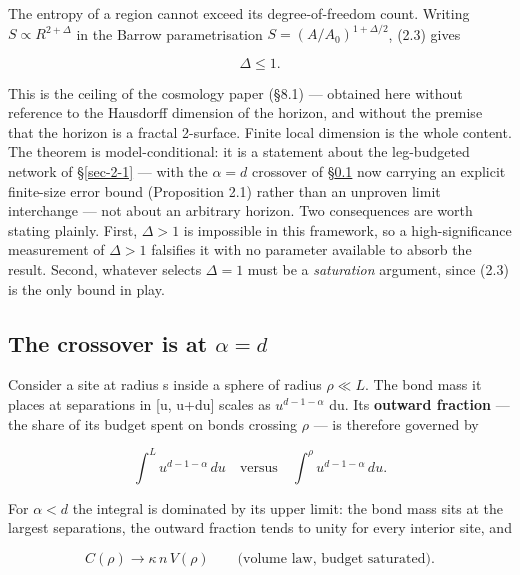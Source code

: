 \documentclass[aps,prd,preprint,nofootinbib,superscriptaddress]{revtex4-2}
\begin{document}
The entropy of a region cannot exceed its degree-of-freedom count.
Writing \(S \propto  R^{2+\Delta }\) in the Barrow parametrisation
\(S = (A/A_{0})^{1+\Delta /2}\), (2.3) gives

\begin{equation}\Delta \le 1. \tag{2.4}\end{equation}

This is the ceiling of the cosmology paper (§8.1)
\citep{Pandev:2026cosmology} --- obtained here without reference to the
Hausdorff dimension of the horizon, and without the premise that the
horizon is a fractal 2-surface. Finite local dimension is the whole
content. The theorem is model-conditional: it is a statement about the
leg-budgeted network of §\ref{sec-2-1} --- with the \(\alpha  = d\)
crossover of §\ref{sec-2-3} now carrying an explicit finite-size error
bound (Proposition 2.1) rather than an unproven limit interchange ---
not about an arbitrary horizon. Two consequences are worth stating
plainly. First, \(\Delta  > 1\) is impossible in this framework, so a
high-significance measurement of \(\Delta  > 1\) falsifies it with no
parameter available to absorb the result. Second, whatever selects
\(\Delta  = 1\) must be a \emph{saturation} argument, since (2.3) is the
only bound in play.

\subsection{\texorpdfstring{The crossover is at
\(\alpha  = d\)}{The crossover is at \textbackslash alpha  = d}}\label{sec-2-3}

Consider a site at radius s inside a sphere of radius \(\rho  \ll  L\).
The bond mass it places at separations in {[}u, u+du{]} scales as
\(u^{d-1-\alpha }\) du. Its \textbf{outward fraction} --- the share of
its budget spent on bonds crossing \(\rho\) --- is therefore governed by

\begin{equation}\int^L u^{d-1-\alpha}\,du \quad\text{versus}\quad \int^\rho u^{d-1-\alpha}\,du. \tag{2.5}\end{equation}

For \(\alpha  < d\) the integral is dominated by its upper limit: the
bond mass sits at the largest separations, the outward fraction tends to
unity for every interior site, and

\begin{equation}C(\rho) \to \kappa\, n\, V(\rho) \qquad \text{(volume law, budget saturated).} \tag{2.6}\end{equation}
\end{document}
